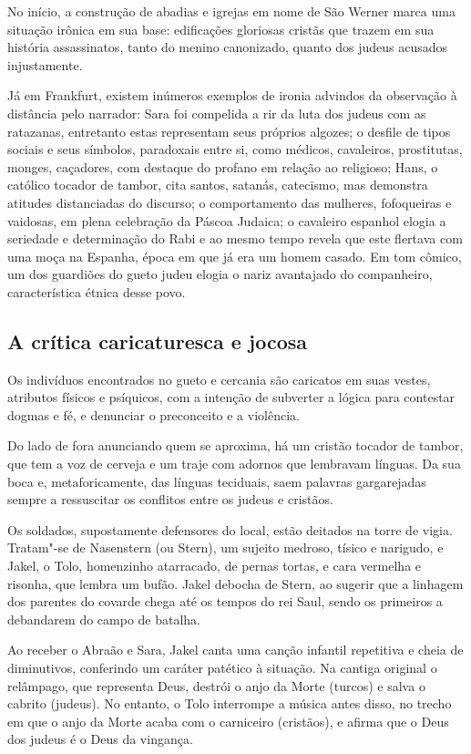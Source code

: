 \documentclass[12pt]{extarticle}
\begin{document}
No início, a construção de abadias e igrejas em nome de São Werner marca
uma situação irônica em sua base: edificações gloriosas cristãs que
trazem em sua história assassinatos, tanto do menino canonizado, quanto
dos judeus acusados injustamente.

Já em Frankfurt, existem inúmeros exemplos de ironia advindos da
observação à distância pelo narrador: Sara foi compelida a rir da luta
dos judeus com as ratazanas, entretanto estas representam seus próprios
algozes; o desfile de tipos sociais e seus símbolos, paradoxais entre
si, como médicos, cavaleiros, prostitutas, monges, caçadores, com
destaque do profano em relação ao religioso; Hans, o católico tocador de
tambor, cita santos, satanás, catecismo, mas demonstra atitudes
distanciadas do discurso; o comportamento das mulheres, fofoqueiras e
vaidosas, em plena celebração da Páscoa Judaica; o cavaleiro espanhol
elogia a seriedade e determinação do Rabi e ao mesmo tempo revela que
este flertava com uma moça na Espanha, época em que já era um homem
casado. Em tom cômico, um dos guardiões do gueto judeu elogia o nariz
avantajado do companheiro, característica étnica desse povo.

\subsection{A crítica caricaturesca e jocosa }

Os indivíduos encontrados no gueto e cercania são caricatos em suas
vestes, atributos físicos e psíquicos, com a intenção de subverter a
lógica para contestar dogmas e fé, e denunciar o preconceito e a
violência.

Do lado de fora anunciando quem se aproxima, há um cristão tocador de
tambor, que tem a voz de cerveja e um traje com adornos que lembravam
línguas. Da sua boca e, metaforicamente, das línguas teciduais, saem
palavras gargarejadas sempre a ressuscitar os conflitos entre os judeus
e cristãos.

Os soldados, supostamente defensores do local, estão deitados na torre
de vigia. Tratam"-se de Nasenstern (ou Stern), um sujeito medroso, tísico
e narigudo, e Jakel, o Tolo, homenzinho atarracado, de pernas tortas, e
cara vermelha e risonha, que lembra um bufão. Jakel debocha de Stern, ao
sugerir que a linhagem dos parentes do covarde chega até os tempos do
rei Saul, sendo os primeiros a debandarem do campo de batalha.

Ao receber o Abraão e Sara, Jakel canta uma canção infantil repetitiva e
cheia de diminutivos, conferindo um caráter patético à situação. Na
cantiga original o relâmpago, que representa Deus, destrói o anjo da
Morte (turcos) e salva o cabrito (judeus). No entanto, o Tolo interrompe
a música antes disso, no trecho em que o anjo da Morte acaba com o
carniceiro (cristãos), e afirma que o Deus dos judeus é o Deus da
vingança.
\end{document}

